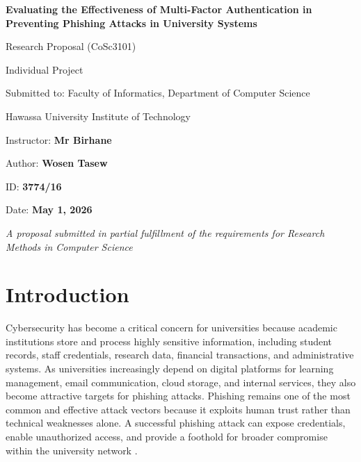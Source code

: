 \documentclass[11pt]{article}
\begin{document}
\begin{titlepage}
    \centering
    \vspace*{1cm}
    {\Huge\bfseries Evaluating the Effectiveness of Multi-Factor Authentication in Preventing Phishing Attacks in University Systems\par}
    \vspace{1.5cm}
    {\Large Research Proposal (CoSc3101)\par}
    \vspace{0.5cm}
    {\large Individual Project\par}
    \vspace{1.5cm}
    {\large Submitted to: Faculty of Informatics, Department of Computer Science\par}
    \vspace{0.5cm}
    {\large Hawassa University Institute of Technology\par}
    \vspace{1.5cm}
    {\large Instructor: \textbf{Mr Birhane}\par}
    \vspace{0.2cm}
    {\large Author: \textbf{Wosen Tasew}\par}
    \vspace{0.2cm}
    {\large ID: \textbf{3774/16}\par}
    \vspace{0.2cm}
    {\large Date: \textbf{May 1, 2026}\par}
    \vfill
    {\large \textit{A proposal submitted in partial fulfillment of the requirements for Research Methods in Computer Science}\par}
\end{titlepage}

\newpage
\tableofcontents
\newpage

\section{Introduction}

Cybersecurity has become a critical concern for universities because academic institutions store and process highly sensitive information, including student records, staff credentials, research data, financial transactions, and administrative systems. As universities increasingly depend on digital platforms for learning management, email communication, cloud storage, and internal services, they also become attractive targets for phishing attacks. Phishing remains one of the most common and effective attack vectors because it exploits human trust rather than technical weaknesses alone. A successful phishing attack can expose credentials, enable unauthorized access, and provide a foothold for broader compromise within the university network \cite{tesfaye2025ethiopia,rodriguez2024evilginx}.
\end{document}
